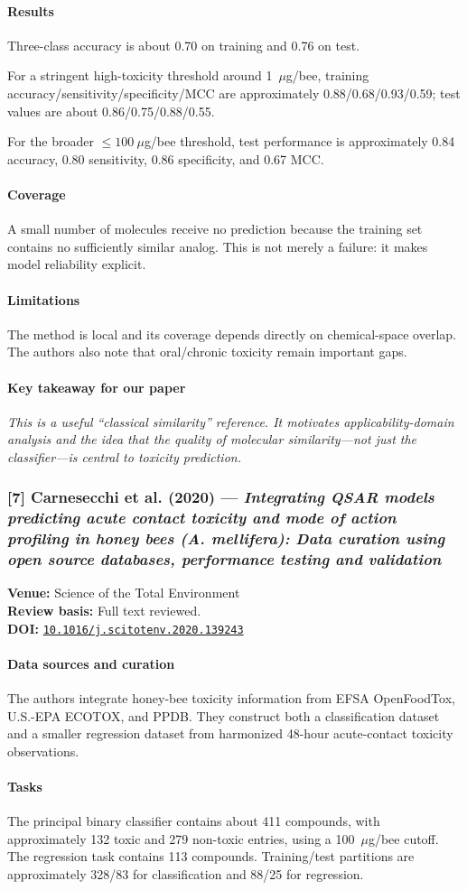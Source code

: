 \documentclass[11pt]{article}
\newcommand{\reviewfield}[2]{\paragraph{#1}#2}
\newcommand{\keytakeaway}[1]{\paragraph{Key takeaway for our paper}\emph{#1}}
\newcommand{\paperdoi}[1]{\href{https://doi.org/#1}{\texttt{#1}}}
\begin{document}
\reviewfield{Results}{
Three-class accuracy is about 0.70 on training and 0.76 on test.

For a stringent high-toxicity threshold around 1~$\mu$g/bee, training accuracy/sensitivity/specificity/MCC are approximately 0.88/0.68/0.93/0.59; test values are about 0.86/0.75/0.88/0.55.

For the broader $\leq100~\mu$g/bee threshold, test performance is approximately 0.84 accuracy, 0.80 sensitivity, 0.86 specificity, and 0.67 MCC.
}

\reviewfield{Coverage}{
A small number of molecules receive no prediction because the training set contains no sufficiently similar analog. This is not merely a failure: it makes model reliability explicit.
}

\reviewfield{Limitations}{
The method is local and its coverage depends directly on chemical-space overlap. The authors also note that oral/chronic toxicity remain important gaps.
}

\keytakeaway{This is a useful ``classical similarity'' reference. It motivates applicability-domain analysis and the idea that the quality of molecular similarity---not just the classifier---is central to toxicity prediction.}


\subsubsection{[7] Carnesecchi et al. (2020) --- \textit{Integrating QSAR models predicting acute contact toxicity and mode of action profiling in honey bees (A. mellifera): Data curation using open source databases, performance testing and validation}}
\textbf{Venue:} Science of the Total Environment\\
\textbf{Review basis:} Full text reviewed.\\
\textbf{DOI:} \paperdoi{10.1016/j.scitotenv.2020.139243}

\reviewfield{Data sources and curation}{
The authors integrate honey-bee toxicity information from EFSA OpenFoodTox, U.S.-EPA ECOTOX, and PPDB. They construct both a classification dataset and a smaller regression dataset from harmonized 48-hour acute-contact toxicity observations.
}

\reviewfield{Tasks}{
The principal binary classifier contains about 411 compounds, with approximately 132 toxic and 279 non-toxic entries, using a 100~$\mu$g/bee cutoff. The regression task contains 113 compounds. Training/test partitions are approximately 328/83 for classification and 88/25 for regression.
}
\end{document}
